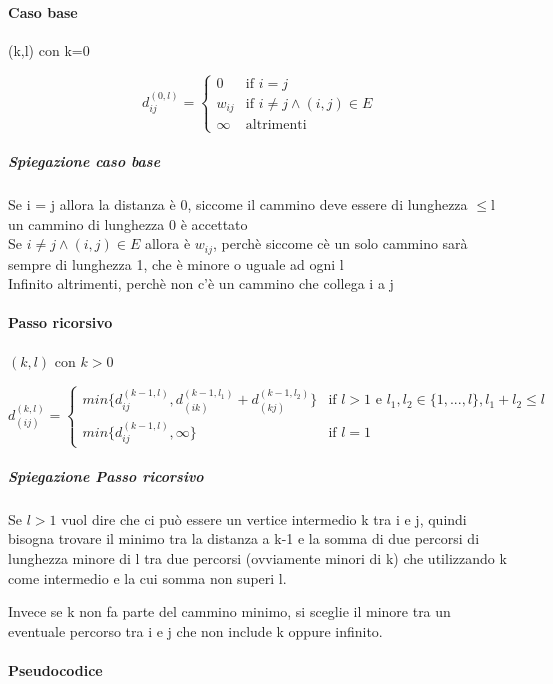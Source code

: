 \documentclass[12pt, a4paper, openany]{book}
\begin{document}
\paragraph{Caso base} (k,l) con k=0

\begin{equation*}
	d^{(0,l)}_{ij}= \begin{cases}
		0      & \text{if $i = j$}                      \\
		w_{ij} & \text{if $i \neq j \land (i,j) \in E$} \\
		\infty & \text{altrimenti}
	\end{cases}
\end{equation*}

\subparagraph{Spiegazione caso base}
Se i = j allora la distanza è 0, siccome il cammino deve essere di lunghezza $\leq$l un cammino di lunghezza 0 è accettato
\\Se $i \neq j \land (i,j) \in E$ allora è $w_{ij}$, perchè siccome cè un solo cammino sarà sempre di lunghezza 1, che è minore o uguale ad ogni l
\\Infinito altrimenti, perchè non c'è un cammino che collega i a j

\paragraph{Passo ricorsivo} $(k,l)$ con $k>0$

\begin{equation*}
	d^{(k,l)}_{(ij)} = \begin{cases}
		min\{d^{(k-1,l)}_{ij}, d^{(k-1,l_1)}_{(ik)} + d^{(k-1,l_2)}_{(kj)}  \} & \text{if $l > 1$ e $l_1,l_2\in\{1,...,l\}, l_1+l_2\leq l$ } \\
		min\{d^{(k-1,l)}_{ij}, \infty \}                                       & \text{if $l = 1$}
	\end{cases}
\end{equation*}

\subparagraph*{Spiegazione Passo ricorsivo}
Se $l > 1$ vuol dire che ci può essere un vertice intermedio k tra i e j, quindi bisogna trovare il minimo tra
la distanza a k-1 e la somma di due percorsi di lunghezza minore di l tra due percorsi (ovviamente minori di k) che utilizzando k come intermedio e la
cui somma non superi l.

Invece se k non fa parte del cammino minimo, si sceglie il minore tra un eventuale percorso tra i e j che non include k oppure infinito.

\paragraph{Pseudocodice}
\end{document}
